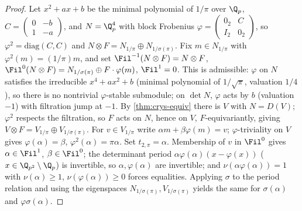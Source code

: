 \begin{proof}
  Let \(x^2 + ax + b\) be the minimal polynomial of \(1/\pi\) over \(\Q_p\),
  \(C = \left(\begin{smallmatrix} 0 & -b \\ 1 & -a \end{smallmatrix}\right)\),
  and \(N = \Q_p^4\) with block Frobenius
  \(\varphi = \left(\begin{smallmatrix} 0_2 & C \\ I_2 & 0_2 \end{smallmatrix}\right)\),
  so \(\varphi^2 = \mathrm{diag}(C, C)\) and \(N \otimes F = N_{1/\pi} \oplus
  N_{1/\sigma(\pi)}\). Fix \(m \in N_{1/\pi}\) with \(\varphi^2(m) = (1/\pi)m\),
  and set \(\Fil^{-1}(N \otimes F) = N \otimes F\), \(\Fil^0(N \otimes F) =
  N_{1/\sigma(\pi)} \oplus F \cdot \varphi(m)\), \(\Fil^1 = 0\). This is
  admissible: \(\varphi\) on \(N\) satisfies the irreducible \(x^4 + ax^2 + b\)
  (minimal polynomial of \(1/\sqrt{\pi}\), valuation \(1/4\)), so there is no
  nontrivial \(\varphi\)-stable submodule; on \(\det N\), \(\varphi\) acts by
  \(b\) (valuation \(-1\)) with filtration jump at \(-1\). By
  \cref{thm:crys-equiv} there is \(V\) with \(N = D(V)\); \(\varphi^2\) respects
  the filtration, so \(F\) acts on \(N\), hence on \(V\), \(F\)-equivariantly,
  giving \(V \otimes F = V_{1/\pi} \oplus V_{1/\sigma(\pi)}\). For \(v \in
  V_{1/\pi}\) write \(\alpha m + \beta \varphi(m) = v\); \(\varphi\)-triviality
  on \(V\) gives \(\varphi(\alpha) = \beta\), \(\varphi^2(\alpha) = \pi\alpha\).
  Set \(t_{2,\pi} = \alpha\). Membership of \(v\) in \(\Fil^0\) gives \(\alpha
  \in \Fil^1\), \(\beta \in \Fil^0\); the determinant period \(\alpha\varphi(\alpha)
  (x - \varphi(x))\) (\(x \in \Q_{p^2} \setminus \Q_p\)) is invertible, so
  \(\alpha, \varphi(\alpha)\) are invertible; and \(\nu(\alpha\varphi(\alpha)) =
  1\) with \(\nu(\alpha) \geq 1\), \(\nu(\varphi(\alpha)) \geq 0\) forces
  equalities. Applying \(\sigma\) to the period relation and using the eigenspaces
  \(N_{1/\sigma(\pi)}, V_{1/\sigma(\pi)}\) yields the same for \(\sigma(\alpha)\)
  and \(\varphi\sigma(\alpha)\).
\end{proof}

